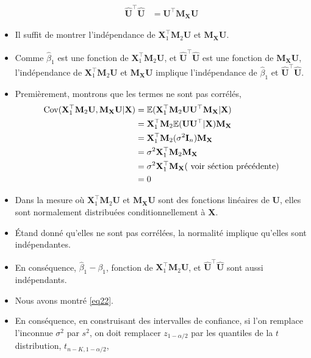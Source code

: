 \begin{frame}[allowframebreaks]
\begin{itemize}
\begin{align*}
\widehat{\mathbf{U}}^\top\widehat{\mathbf{U}}&=\mathbf{U}^\top\mathbf{M}_\mathbf{X}\mathbf{U}
\end{align*}
\item Il suffit de montrer l'indépendance de $\mathbf{X}_1^\top\mathbf{M}_2\mathbf{U}$ et  $\mathbf{M}_\mathbf{X}\mathbf{U}$.
\item  Comme $\widehat{\beta}_1$ est une fonction de $\mathbf{X}_1^\top\mathbf{M}_2\mathbf{U}$, et $\widehat{\mathbf{U}}^\top\widehat{\mathbf{U}}$ est une fonction de $\mathbf{M}_\mathbf{X}\mathbf{U}$, l'indépendance de $\mathbf{X}_1^\top\mathbf{M}_2\mathbf{U}$ et  $\mathbf{M}_\mathbf{X}\mathbf{U}$ implique l'indépendance de $\widehat{\beta}_1$ et $\widehat{\mathbf{U}}^\top\widehat{\mathbf{U}}$. 
\item Premièrement, montrons que les termes ne sont pas corrélés,
\begin{align*}
\mathrm{Cov}(\mathbf{X}_1^\top\mathbf{M}_2\mathbf{U}, \mathbf{M}_\mathbf{X}\mathbf{U} | \mathbf{X}) &=\mathbb{E}(\mathbf{X}_1^\top\mathbf{M}_2\mathbf{U}\mathbf{U}^\top \mathbf{M}_\mathbf{X}|\mathbf{X})\\
&=\mathbf{X}_1^\top\mathbf{M}_2\mathbb{E}(\mathbf{U}\mathbf{U}^\top|\mathbf{X})\mathbf{M}_\mathbf{X}\\
&=\mathbf{X}_1^\top\mathbf{M}_2(\sigma^2\mathbf{I}_n)\mathbf{M}_\mathbf{X}\\
&=\sigma^2\mathbf{X}_1^\top\mathbf{M}_2\mathbf{M}_\mathbf{X}\\
&=\sigma^2\mathbf{X}_1^\top\mathbf{M}_\mathbf{X}( \ \textrm{voir séction précédente})\\
&=0
\end{align*}
\item Dans la mesure où $\mathbf{X}_1^\top\mathbf{M}_2\mathbf{U}$ et $\mathbf{M}_\mathbf{X}\mathbf{U}$ sont des fonctions linéaires de $\mathbf{U}$, elles sont normalement distribuées conditionnellement à $\mathbf{X}$.
 \item \'Etand donné qu'elles ne sont pas corrélées, la normalité implique qu'elles sont indépendantes. 
\item En conséquence, $\widehat{\beta}_1 - \beta_1$, fonction de  $\mathbf{X}_1^\top\mathbf{M}_2\mathbf{U}$, et $\widehat{\mathbf{U}}^\top\widehat{\mathbf{U}}$ sont aussi indépendants.
\item Nous avons montré \eqref{eq22}. 
\item En conséquence, en construisant des intervalles de confiance, si l'on remplace l'inconnue $\sigma^2$ par $s^2$, on doit remplacer $z_{1-\alpha/2}$ par les quantiles de la $t$ distribution, $t_{n-K, 1-\alpha/2}$,

\end{itemize}
\end{frame}
